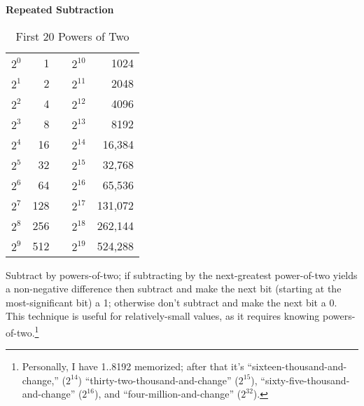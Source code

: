 \documentclass{article}
\begin{document}
\textbf{Repeated Subtraction}

\begin{table}
\centering
\begin{tabular}{|c|r|c|c|r|}\cline{1-2}\cline{4-5}
$2^0$ & 1 & \phantom{extra space} & $2^{10}$ & 1024 \\ \cline{1-2}\cline{4-5}
$2^1$ &   2 & & $2^{11}$ &    2048 \\ \cline{1-2}\cline{4-5}
$2^2$ &   4 & & $2^{12}$ &    4096 \\ \cline{1-2}\cline{4-5}
$2^3$ &   8 & & $2^{13}$ &    8192 \\ \cline{1-2}\cline{4-5}
$2^4$ &  16 & & $2^{14}$ &  16,384 \\ \cline{1-2}\cline{4-5}
$2^5$ &  32 & & $2^{15}$ &  32,768 \\ \cline{1-2}\cline{4-5}
$2^6$ &  64 & & $2^{16}$ &  65,536 \\ \cline{1-2}\cline{4-5}
$2^7$ & 128 & & $2^{17}$ & 131,072 \\ \cline{1-2}\cline{4-5}
$2^8$ & 256 & & $2^{18}$ & 262,144 \\ \cline{1-2}\cline{4-5}
$2^9$ & 512 & & $2^{19}$ & 524,288 \\ \cline{1-2}\cline{4-5}
\end{tabular}
\caption{First 20 Powers of Two}
\end{table}

Subtract by powers-of-two; if subtracting by the next-greatest power-of-two
yields a non-negative difference then subtract and make the next bit (starting
at the most-significant bit) a 1; otherwise don't subtract and make the next bit
a 0. This technique is useful for relatively-small values, as it requires
knowing powers-of-two.\footnote{Personally, I have 1..8192 memorized; after
that it's ``sixteen-thousand-and-change,'' ($2^{14}$)
``thirty-two-thousand-and-change'' ($2^{15}$),
``sixty-five-thousand-and-change'' ($2^{16}$), and ``four-million-and-change''
($2^{32}$).}
\end{document}
